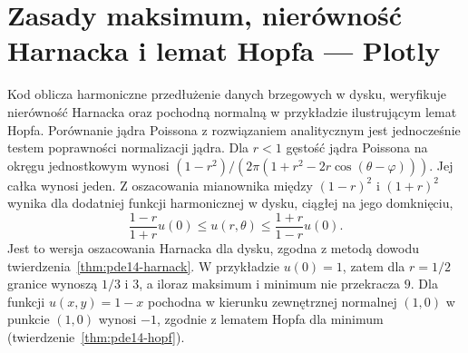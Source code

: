 \section{Zasady maksimum, nierówność Harnacka i lemat Hopfa — Plotly}
Kod oblicza harmoniczne przedłużenie danych brzegowych w dysku,
weryfikuje nierówność Harnacka oraz pochodną normalną w przykładzie
ilustrującym lemat Hopfa. Porównanie jądra Poissona z rozwiązaniem
analitycznym jest jednocześnie testem poprawności normalizacji jądra.
Dla $r<1$ gęstość jądra Poissona na okręgu jednostkowym
wynosi $(1-r^2)/(2\pi(1+r^2-2r\cos(\theta-\varphi)))$.
Jej całka wynosi jeden. Z oszacowania mianownika
między $(1-r)^2$ i $(1+r)^2$ wynika dla dodatniej
funkcji harmonicznej w dysku, ciągłej na jego domknięciu,
\[
 \frac{1-r}{1+r}u(0)
 \le u(r,\theta)\le\frac{1+r}{1-r}u(0).
\]
Jest to wersja oszacowania Harnacka dla dysku,
zgodna z metodą dowodu twierdzenia~\ref{thm:pde14-harnack}.
W przykładzie $u(0)=1$, zatem dla $r=1/2$
granice wynoszą $1/3$ i $3$, a iloraz maksimum
i minimum nie przekracza $9$.
Dla funkcji $u(x,y)=1-x$ pochodna w kierunku
zewnętrznej normalnej $(1,0)$ w punkcie $(1,0)$
wynosi $-1$, zgodnie z lematem Hopfa dla minimum
(twierdzenie~\ref{thm:pde14-hopf}).
